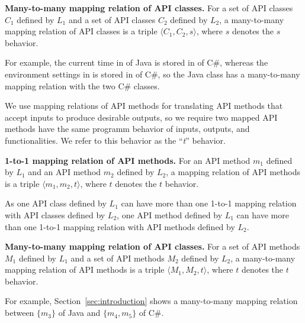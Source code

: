 \textbf{Many-to-many mapping relation of API classes.} For a set of API classes
$C_1$ defined by $L_1$ and a set of API classes $C_2$ defined by
$L_2$, a many-to-many mapping relation of API classes is a triple
$\langle C_1, C_2, s \rangle$, where $s$ denotes the $s$ behavior.

For example, the current time in  of Java
is stored in  of C\#, whereas the
environment settings in  is stored in
 of C\#, so the Java class has a
many-to-many mapping relation with the two C\# classes.

We use mapping relations of API methods for translating API methods
that accept inputs to produce desirable outputs, so we require two
mapped API methods have the same programm behavior of inputs, outputs, and
functionalities. We refer to this behavior as the ``\emph{t}'' behavior.

\textbf{1-to-1 mapping relation of API methods.} For an API method
$m_1$ defined by $L_1$ and an API method $m_2$ defined by
$L_2$, a mapping relation of API methods is a triple $\langle m_1,
m_2, t \rangle$, where $t$ denotes the $t$ behavior.

As one API class defined by $L_1$ can have more than one 1-to-1 mapping
relation with API classes defined by $L_2$, one API method defined by $L_1$ can have more than one 1-to-1 mapping relation with API methods defined by $L_2$. 

\textbf{Many-to-many mapping relation of API classes.} For a set of API methods
$M_1$ defined by $L_1$ and a set of API methods $M_2$ defined by
$L_2$, a many-to-many mapping relation of API methods is a triple
$\langle M_1, M_2, t \rangle$, where $t$ denotes the $t$ behavior.

For example, Section~\ref{sec:introduction} shows a many-to-many mapping relation between $\{m_3\}$ of Java and $\{m_4, m_5\}$ of C\#. 